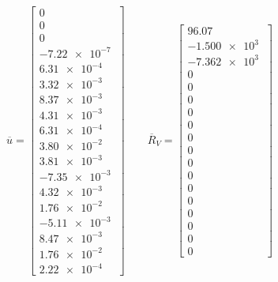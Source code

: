 \[
\label{vet:UeRV}
\overline{u} = \left[
    \begin{array}{c}
    0\\0\\0\\\SI{-7.22e-7}{}\\\SI{6.31e-4}{}\\\SI{3.32e-3}{}\\\SI{8.37e-3}{}\\\SI{4.31e-3}{}\\\SI{6.31e-4}{}\\\SI{3.80e-2}{}\\\SI{3.81e-3}{}\\\SI{-7.35e-3}{}\\\SI{4.32e-3}{}\\\SI{1.76e-2}{}\\\SI{-5.11e-3}{}\\\SI{8.47e-3}{}\\\SI{1.76e-2}{}\\\SI{2.22e-4}{}
    \end{array}
    \right]
\qquad    
\overline{R}_V = \left[
    \begin{array}{c}
    96.07\\\SI{-1.500e3}{}\\\SI{-7.362e3}{}\\0\\0\\0\\0\\0\\0\\0\\0\\0\\0\\0\\0\\0\\0\\0 
    \end{array}
    \right]
\]
